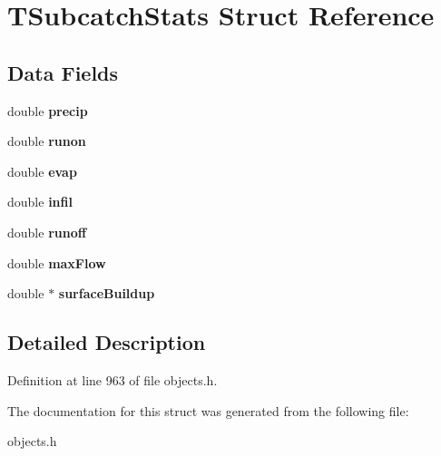 \hypertarget{struct_t_subcatch_stats}{}\section{T\+Subcatch\+Stats Struct Reference}
\label{struct_t_subcatch_stats}
\subsection*{Data Fields}
\begin{DoxyCompactItemize}
\item 
\mbox{\label{struct_t_subcatch_stats_ae11df28fab54a971c728317b8f036280}} 
double {\bfseries precip}
\item 
\mbox{\label{struct_t_subcatch_stats_a9c2f6d7b4e1741bc149a8f38ec6cc22d}} 
double {\bfseries runon}
\item 
\mbox{\label{struct_t_subcatch_stats_a90a48831849f8794a1ab4988b4755e23}} 
double {\bfseries evap}
\item 
\mbox{\label{struct_t_subcatch_stats_a870be47f33955d02d624bc9de06adad0}} 
double {\bfseries infil}
\item 
\mbox{\label{struct_t_subcatch_stats_a365dc60f2331a4280fc2be55b822191c}} 
double {\bfseries runoff}
\item 
\mbox{\label{struct_t_subcatch_stats_a50e437bc9d75ebd303d3e48e56416ad3}} 
double {\bfseries max\+Flow}
\item 
\mbox{\label{struct_t_subcatch_stats_a27f6ee83436525bcfa2f8b490c7c8785}} 
double $\ast$ {\bfseries surface\+Buildup}
\end{DoxyCompactItemize}


\subsection{Detailed Description}


Definition at line 963 of file objects.\+h.



The documentation for this struct was generated from the following file\+:\begin{DoxyCompactItemize}
\item 
objects.\+h\end{DoxyCompactItemize}
